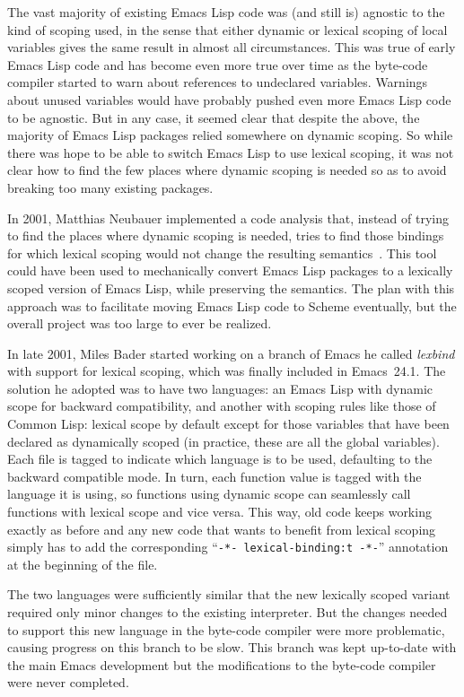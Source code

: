 \documentclass[format=acmsmall,screen]{acmart}
\newcommand \Elisp {Emacs Lisp}
\begin{document}
The vast majority of existing \Elisp{} code was (and still is) agnostic to
the kind of scoping used, in the sense that either dynamic or lexical scoping
of local variables gives the same result in almost all circumstances.  This was true of early
\Elisp{} code and has become even more true over time as the byte-code compiler
started to warn about references to undeclared variables.  Warnings about
unused variables would have probably pushed even more \Elisp{} code to be
agnostic.  But in any case, it seemed clear that despite the above, the
majority of \Elisp{} packages relied somewhere on dynamic scoping.  So while
there was hope to be able to switch \Elisp{} to use lexical scoping, it was
not clear how to find the few places where dynamic scoping is needed so as
to avoid breaking too many existing packages.

In 2001, Matthias Neubauer implemented a code
analysis that, instead of trying to find the places where dynamic scoping is
needed, tries to find those bindings for which lexical scoping would not
change the resulting semantics~\cite{Neubauer01}.
This tool could have been used to
mechanically convert \Elisp{} packages to a lexically scoped version of
\Elisp{}, while preserving the semantics.  The plan with this approach
was to facilitate moving \Elisp{} code to Scheme eventually, but the
overall project was too large to ever be realized.

In late 2001, Miles Bader started working on a branch of Emacs he called
\emph{lexbind} with support for lexical scoping, which was finally included
in Emacs~24.1.  The solution he adopted was to have two languages: an
\Elisp{} with dynamic scope for backward compatibility, and another with
scoping rules like those of Common Lisp: lexical scope by default
except for those variables that have been declared as dynamically
scoped (in
practice, these are all the global variables).  Each file is tagged to
indicate which language is to be used, defaulting to the backward compatible
mode.  In turn, each function value is tagged with the language it is
using, so functions using dynamic scope can seamlessly call functions with
lexical scope and vice versa.  This way, old code keeps working exactly
as before and any new code that wants to benefit from lexical scoping
simply has to add the corresponding ``\texttt{-*- lexical-binding:t -*-}''
annotation at the beginning of the file.

The two languages were sufficiently similar that the new lexically scoped
variant required only minor changes to the existing interpreter.  But the
changes needed to support this new language in the byte-code compiler were more
problematic, causing progress on this branch to be slow.  This branch was
kept up-to-date with the main Emacs development but the modifications to the
byte-code compiler were never completed.
\end{document}
